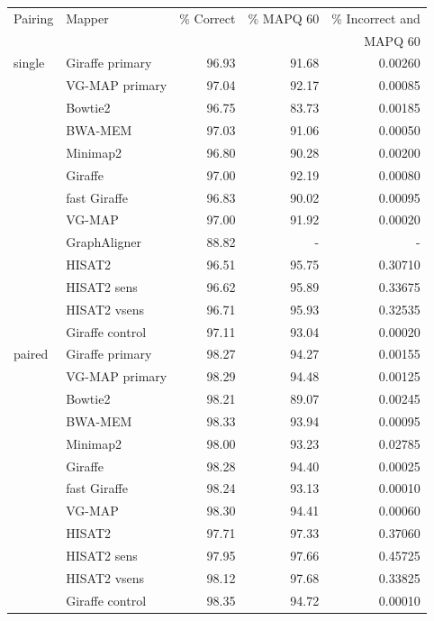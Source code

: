 \documentclass[11pt]{ucscthesis}
\begin{document}
\begin{table}[p]
    \centering
    \begin{tabular}{|l|l|r|r|r|}
    \hline
        Pairing & Mapper & \% Correct & \% MAPQ 60 & \% Incorrect and \\
               &         &            &            & MAPQ 60          \\
        \hline
        single  & Giraffe primary	& 96.93     & 91.68     & 0.00260 \\
                & VG-MAP primary	& 97.04     & 92.17     & 0.00085 \\
                & Bowtie2       	& 96.75     & 83.73     & 0.00185 \\
                & BWA-MEM	        & 97.03     & 91.06     & 0.00050 \\
                & Minimap2	        & 96.80     & 90.28     & 0.00200 \\
                & Giraffe	        & 97.00     & 92.19     & 0.00080 \\
                & fast Giraffe	    & 96.83     & 90.02     & 0.00095 \\
                & VG-MAP	        & 97.00     & 91.92     & 0.00020 \\
                & GraphAligner 	    & 88.82     & -         & - \\
                & HISAT2	        & 96.51     & 95.75     & 0.30710 \\
                & HISAT2 sens	    & 96.62     & 95.89     & 0.33675 \\
                & HISAT2 vsens  	& 96.71     & 95.93     & 0.32535 \\
                & Giraffe control	& 97.11     & 93.04     & 0.00020 \\

        \hline
        paired  & Giraffe primary	& 98.27     & 94.27     & 0.00155 \\
                & VG-MAP primary   	& 98.29     & 94.48     & 0.00125 \\
                & Bowtie2       	& 98.21     & 89.07     & 0.00245 \\
                & BWA-MEM	        & 98.33     & 93.94     & 0.00095 \\
                & Minimap2	        & 98.00     & 93.23     & 0.02785 \\
                & Giraffe	        & 98.28     & 94.40     & 0.00025 \\
                & fast Giraffe	    & 98.24     & 93.13     & 0.00010 \\
                & VG-MAP	        & 98.30     & 94.41     & 0.00060 \\
                & HISAT2        	& 97.71     & 97.33     & 0.37060 \\
                & HISAT2 sens   	& 97.95     & 97.66     & 0.45725 \\
                & HISAT2 vsens	    & 98.12     & 97.68     & 0.33825 \\
                & Giraffe control	& 98.35     & 94.72     & 0.00010 \\
        \hline
        

\end{tabular}
\end{table}
\end{document}
